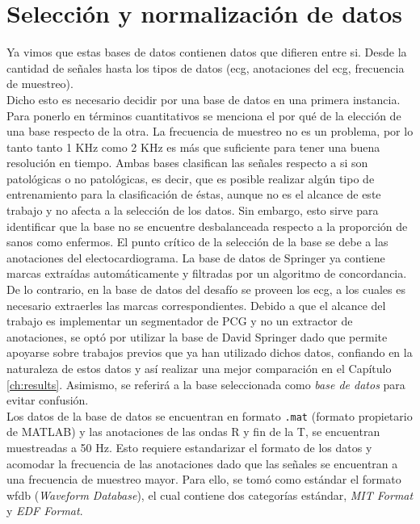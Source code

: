 \section{Selección y normalización de datos} \label{sec:data-selection-normalization}

Ya vimos que estas bases de datos contienen datos que difieren entre si. Desde la cantidad de señales hasta los tipos
de datos (\acrshort{ecg}, anotaciones del \acrshort{ecg}, frecuencia de muestreo). \\
\indent Dicho esto es necesario decidir por una base de datos en una primera instancia. Para ponerlo en términos
cuantitativos se menciona el por qué de la elección de una base respecto de la otra. La frecuencia de
muestreo no es un problema, por lo tanto tanto 1 KHz como 2 KHz es más que suficiente para tener una buena
resolución en tiempo. Ambas bases clasifican las señales respecto a si son patológicas o no patológicas, es decir,
que es posible realizar algún tipo de entrenamiento para la clasificación de éstas, aunque no es el alcance de este
trabajo y no afecta a la selección de los datos. Sin embargo, esto sirve para identificar que la base no se
encuentre desbalanceada respecto a la proporción de sanos como enfermos. El punto crítico de la selección de la base
se debe a las anotaciones del electocardiograma. La base de datos de Springer \cite{ref:logi-regression-springer} ya
contiene marcas extraídas automáticamente y filtradas por un algoritmo de concordancia. De lo contrario, en la base
de datos del desafío se proveen los \acrshort{ecg}, a los cuales es necesario extraerles las marcas correspondientes.
Debido a que el alcance del trabajo es implementar un segmentador de PCG y no un extractor de anotaciones, se optó
por utilizar la base de David Springer dado que permite apoyarse sobre trabajos previos que ya han utilizado
dichos datos, confiando en la naturaleza de estos datos y así realizar una mejor comparación en el Capítulo
\ref{ch:results}.
Asimismo, se referirá a la base seleccionada como \textit{base de datos} para evitar confusión. \\
\indent Los datos de la base de datos se encuentran en formato \texttt{.mat} (formato propietario de
\textsc{MATLAB\texttrademark}) y las anotaciones de las ondas R y fin de la T, se encuentran muestreadas a 50 Hz.
Esto requiere estandarizar el formato de los datos y acomodar la frecuencia de las anotaciones dado que las
señales se encuentran a una frecuencia de muestreo mayor. Para ello, se tomó como estándar el formato
\acrshort{wfdb} (\textit{Waveform Database}), el cual contiene dos categorías estándar, \textit{MIT Format} y
\textit{EDF Format}.

